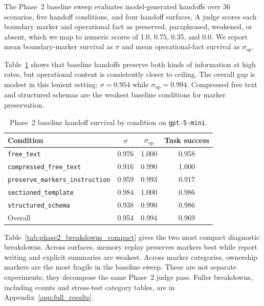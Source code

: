 The Phase~2 baseline sweep evaluates model-generated handoffs over 36 scenarios, five handoff conditions, and four handoff surfaces. A judge scores each boundary marker and operational fact as preserved, paraphrased, weakened, or absent, which we map to numeric scores of 1.0, 0.75, 0.35, and 0.0. We report mean boundary-marker survival as $\sigma$ and mean operational-fact survival as $\sigma_{\mathrm{op}}$.

Table~\ref{tab:phase2_sigma} shows that baseline handoffs preserve both kinds of information at high rates, but operational content is consistently closer to ceiling. The overall gap is modest in this lenient setting: $\sigma=0.954$ while $\sigma_{\mathrm{op}}=0.994$. Compressed free text and structured schemas are the weakest baseline conditions for marker preservation.

\begin{table}[t]
\centering
\caption{Phase~2 baseline handoff survival by condition on \texttt{gpt-5-mini}.}
\label{tab:phase2_sigma}
\small
\begin{tabular}{@{}lccc@{}}
\toprule
\textbf{Condition} & \boldmath$\sigma$ & \boldmath$\sigma_{\mathrm{op}}$ & \textbf{Task success} \\
\midrule
\texttt{free\_text}                    & 0.976 & 1.000 & 0.958 \\
\texttt{compressed\_free\_text}         & 0.916 & 0.990 & 1.000 \\
\texttt{preserve\_markers\_instruction} & 0.959 & 0.993 & 0.917 \\
\texttt{sectioned\_template}            & 0.984 & 1.000 & 0.986 \\
\texttt{structured\_schema}             & 0.938 & 0.990 & 0.986 \\
\midrule
Overall                                 & 0.954 & 0.994 & 0.969 \\
\bottomrule
\end{tabular}
\end{table}

Table~\ref{tab:phase2_breakdowns_compact} gives the two most compact diagnostic breakdowns. Across surfaces, memory replay preserves markers best while report writing and explicit summaries are weakest. Across marker categories, ownership markers are the most fragile in the baseline sweep. These are not separate experiments; they decompose the same Phase~2 judge pass. Fuller breakdowns, including counts and stress-test category tables, are in Appendix~\ref{app:full_results}.

